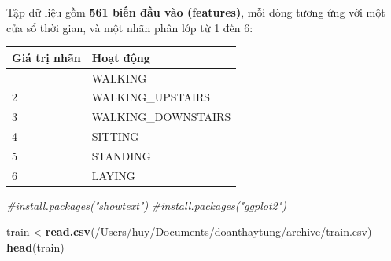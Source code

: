 \documentclass[
]{article}
\newenvironment{Shaded}{\begin{snugshade}}{\end{snugshade}}
\newcommand{\CommentTok}[1]{\textcolor[rgb]{0.56,0.35,0.01}{\textit{#1}}}
\newcommand{\FunctionTok}[1]{\textcolor[rgb]{0.13,0.29,0.53}{\textbf{#1}}}
\newcommand{\NormalTok}[1]{#1}
\newcommand{\OtherTok}[1]{\textcolor[rgb]{0.56,0.35,0.01}{#1}}
\newcommand{\StringTok}[1]{\textcolor[rgb]{0.31,0.60,0.02}{#1}}
\begin{document}
Tập dữ liệu gồm \textbf{561 biến đầu vào (features)}, mỗi dòng tương ứng
với một cửa sổ thời gian, và một nhãn phân lớp từ 1 đến 6:

\begin{longtable}[]{@{}ll@{}}
\toprule\noalign{}
Giá trị nhãn & Hoạt động \\
\midrule\noalign{}
\endhead
\bottomrule\noalign{}
\endlastfoot
1 & WALKING \\
2 & WALKING\_UPSTAIRS \\
3 & WALKING\_DOWNSTAIRS \\
4 & SITTING \\
5 & STANDING \\
6 & LAYING \\
\end{longtable}

\begin{Shaded}
\begin{Highlighting}[]
\CommentTok{\#install.packages("showtext")}
\CommentTok{\#install.packages("ggplot2")}
\end{Highlighting}
\end{Shaded}

\begin{Shaded}
\begin{Highlighting}[]
\NormalTok{train }\OtherTok{\textless{}{-}}\FunctionTok{read.csv}\NormalTok{(}\StringTok{\textquotesingle{}/Users/huy/Documents/doanthaytung/archive/train.csv\textquotesingle{}}\NormalTok{)}
\FunctionTok{head}\NormalTok{(train)}
\end{Highlighting}
\end{Shaded}
\end{document}
